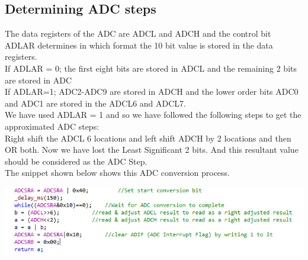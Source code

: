 \documentclass[a4paper,29.6pt]{article}
\begin{document}
\subsection{Determining ADC steps}
\begin{small}
The data registers of the ADC are ADCL and ADCH and the control bit ADLAR determines in which format the 10 bit value is stored in the data registers.\\
If ADLAR = 0;	the first eight bits are stored in ADCL and the remaining 2 bits are stored in ADC\\
If ADLAR=1;	ADC2-ADC9 are stored in ADCH and the lower order bits ADC0 and ADC1 are stored in the ADCL6 and ADCL7.  \\
We have used ADLAR = 1 and so we have followed the following steps to get the approximated ADC steps:\\
	Right shift the ADCL 6 locations and left shift ADCH by 2 locations and then OR both. 
	Now we have lost the Least Significant 2 bits. 
	And this resultant value should be considered as the ADC Step.\\
	\newpage
	The snippet shown below shows this ADC conversion process.
	\begin{center}
\includegraphics[scale=0.75]{adc}
\end{center}

\end{small}
\end{document}
